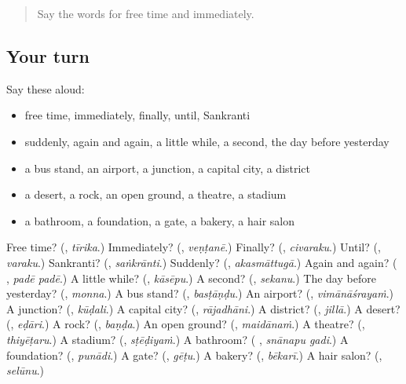 \label{lesson:TE-R216-second-pass-words-from-chapters-212-216}



\begin{quote}
Say the words for free time and immediately.
\end{quote}

\subsection*{Your turn}
Say these aloud:

\begin{itemize}
\raggedright
  \item free time, immediately, finally, until, Sankranti
  \item suddenly, again and again, a little while, a second, the day before yesterday
  \item a bus stand, an airport, a junction, a capital city, a district
  \item a desert, a rock, an open ground, a theatre, a stadium
  \item a bathroom, a foundation, a gate, a bakery, a hair salon
\end{itemize}

\begin{tcolorbox}[breakable,colback=teal!4,colframe=teal!35!black,title={Before you move on}]
Free time? (\textbf{}, \emph{tīrika}.) Immediately? (\textbf{}, \emph{veṇṭanē}.) Finally? (\textbf{}, \emph{civaraku}.) Until? (\textbf{}, \emph{varaku}.) Sankranti? (\textbf{}, \emph{saṅkrānti}.) Suddenly? (\textbf{}, \emph{akasmāttugā}.) Again and again? (\textbf{ }, \emph{padē padē}.) A little while? (\textbf{}, \emph{kāsēpu}.) A second? (\textbf{}, \emph{sekanu}.) The day before yesterday? (\textbf{}, \emph{monna}.) A bus stand? (\textbf{}, \emph{basṭāṇḍu}.) An airport? (\textbf{}, \emph{vimānāśrayaṁ}.) A junction? (\textbf{}, \emph{kūḍali}.) A capital city? (\textbf{}, \emph{rājadhāni}.) A district? (\textbf{}, \emph{jillā}.) A desert? (\textbf{}, \emph{eḍāri}.) A rock? (\textbf{}, \emph{baṇḍa}.) An open ground? (\textbf{}, \emph{maidānaṁ}.) A theatre? (\textbf{}, \emph{thiyēṭaru}.) A stadium? (\textbf{}, \emph{sṭēḍiyaṁ}.) A bathroom? (\textbf{ }, \emph{snānapu gadi}.) A foundation? (\textbf{}, \emph{punādi}.) A gate? (\textbf{}, \emph{gēṭu}.) A bakery? (\textbf{}, \emph{bēkarī}.) A hair salon? (\textbf{}, \emph{selūnu}.)
\end{tcolorbox}
